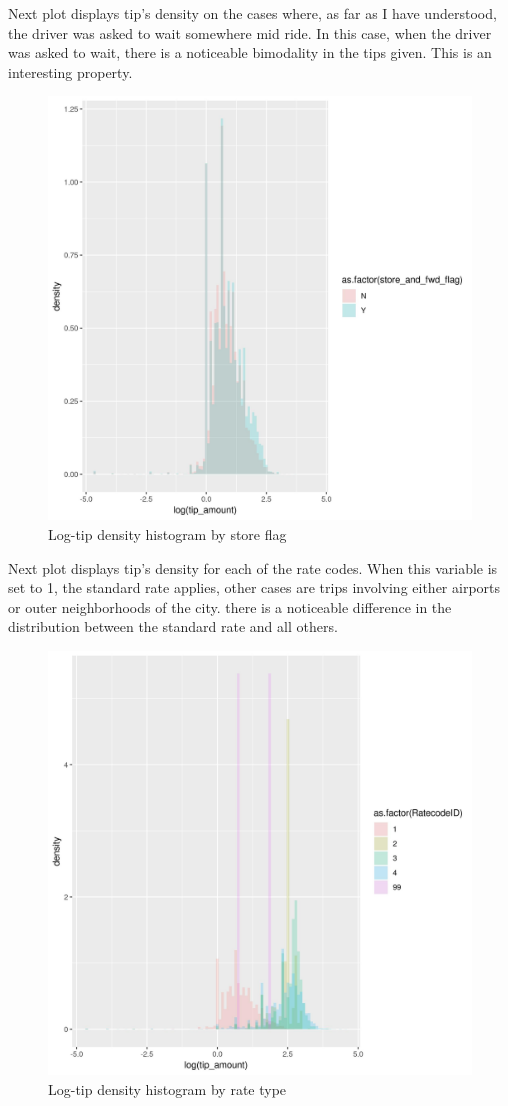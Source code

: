 \documentclass[11pt]{article}
\begin{document}
Next plot displays tip's density on the cases where, as far as I have
understood, the driver was asked to wait somewhere mid ride.
In this case, when the driver was asked to wait, there is a noticeable
bimodality in the tips given. This is an interesting property.
\begin{figure}[htbp]
\centering
\includegraphics[width=.9\linewidth]{./plots/storeCodeTipDensityHist.jpg}
\caption{\label{fig:org6825764}
Log-tip density histogram by store flag}
\end{figure}

Next plot displays tip's density for each of the rate codes.
When this variable is set to 1, the standard rate applies, other
cases are trips involving either airports or outer neighborhoods of
the city. there is a noticeable difference in the distribution between
the standard rate and all others.
\begin{figure}[htbp]
\centering
\includegraphics[width=.9\linewidth]{./plots/rateCodeTipDensityHist.jpg}
\caption{\label{fig:orgf3c7266}
Log-tip density histogram by rate type}
\end{figure}
\end{document}
